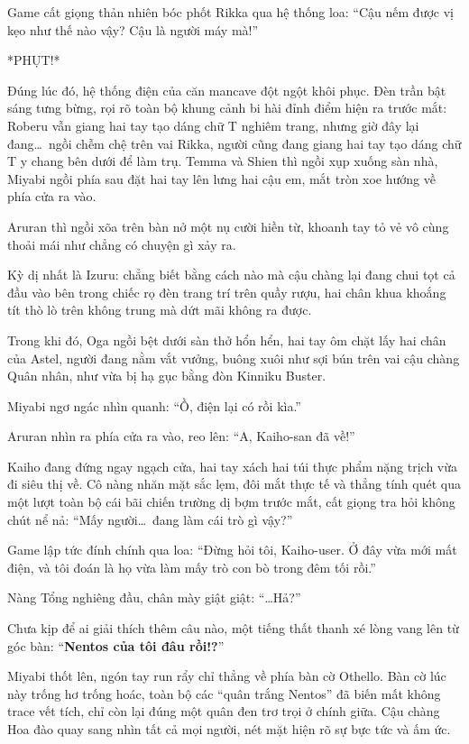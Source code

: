 \documentclass[../main.tex]{subfiles}
\begin{document}
Game cất giọng thản nhiên bóc phốt Rikka qua hệ thống loa: ``Cậu nếm được vị kẹo như thế nào vậy? Cậu là người máy mà!''

*PHỤT!*

Đúng lúc đó, hệ thống điện của căn mancave đột ngột khôi phục. Đèn trần bật sáng tưng bừng, rọi rõ toàn bộ khung cảnh bi hài đỉnh điểm hiện ra trước mắt: Roberu vẫn giang hai tay tạo dáng chữ T nghiêm trang, nhưng giờ đây lại đang\dots\ ngồi chễm chệ trên vai Rikka, người cũng đang giang hai tay tạo dáng chữ T y chang bên dưới để làm trụ. Temma và Shien thì ngồi xụp xuống sàn nhà, Miyabi ngồi phía sau đặt hai tay lên lưng hai cậu em, mắt tròn xoe hướng về phía cửa ra vào.

Aruran thì ngồi xõa trên bàn nở một nụ cười hiền từ, khoanh tay tỏ vẻ vô cùng thoải mái như chẳng có chuyện gì xảy ra.

Kỳ dị nhất là Izuru: chẳng biết bằng cách nào mà cậu chàng lại đang chui tọt cả đầu vào bên trong chiếc rọ đèn trang trí trên quầy rượu, hai chân khua khoắng tít thò lò trên không trung mà dứt mãi không ra được.

Trong khi đó, Oga ngồi bệt dưới sàn thở hổn hển, hai tay ôm chặt lấy hai chân của Astel, người đang nằm vắt vưởng, buông xuôi như sợi bún trên vai cậu chàng Quân nhân, như vừa bị hạ gục bằng đòn Kinniku Buster.


Miyabi ngơ ngác nhìn quanh: ``Ồ, điện lại có rồi kìa.''

Aruran nhìn ra phía cửa ra vào, reo lên: ``A, Kaiho-san đã về!''

Kaiho đang đứng ngay ngạch cửa, hai tay xách hai túi thực phẩm nặng trịch vừa đi siêu thị về. Cô nàng nhăn mặt sắc lẹm, đôi mắt thực tế và thẳng tính quét qua một lượt toàn bộ cái bãi chiến trường dị bợm trước mắt, cất giọng tra hỏi không chút nể nả: ``Mấy người\dots\ đang làm cái trò gì vậy?''

Game lập tức đính chính qua loa: ``Đừng hỏi tôi, Kaiho-user. Ở đây vừa mới mất điện, và tôi đoán là họ vừa làm mấy trò con bò trong đêm tối rồi.''

Nàng Tổng nghiêng đầu, chân mày giật giật: ``\dots Hả?''

Chưa kịp để ai giải thích thêm câu nào, một tiếng thất thanh xé lòng vang lên từ góc bàn: ``\textbf{Nentos của tôi đâu rồi!?}''

Miyabi thốt lên, ngón tay run rẩy chỉ thẳng về phía bàn cờ Othello. Bàn cờ lúc này trống hơ trống hoác, toàn bộ các ``quân trắng Nentos'' đã biến mất không trace vết tích, chỉ còn lại đúng một quân đen trơ trọi ở chính giữa. Cậu chàng Hoa đào quay sang nhìn tất cả mọi người, nét mặt hiện rõ sự bực tức và ấm ức.
\end{document}
